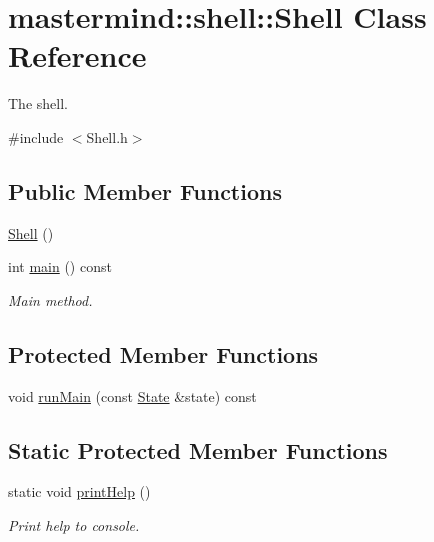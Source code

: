 \hypertarget{classmastermind_1_1shell_1_1_shell}{}\section{mastermind\+:\+:shell\+:\+:Shell Class Reference}
\label{classmastermind_1_1shell_1_1_shell}


The shell.  




{\ttfamily \#include $<$Shell.\+h$>$}

\subsection*{Public Member Functions}
\begin{DoxyCompactItemize}
\item 
\hyperlink{classmastermind_1_1shell_1_1_shell_accc6d14d851bf9adf00c93837c5f1526}{Shell} ()
\item 
int \hyperlink{classmastermind_1_1shell_1_1_shell_ae0b334aea0b022f03424f70593a40a9b}{main} () const
\begin{DoxyCompactList}\small\item\em Main method. \end{DoxyCompactList}\end{DoxyCompactItemize}
\subsection*{Protected Member Functions}
\begin{DoxyCompactItemize}
\item 
void \hyperlink{classmastermind_1_1shell_1_1_shell_ab74c8abb6d0caac122de8906bbcc6a3c}{run\+Main} (const \hyperlink{classmastermind_1_1shell_1_1_state}{State} \&state) const
\end{DoxyCompactItemize}
\subsection*{Static Protected Member Functions}
\begin{DoxyCompactItemize}
\item 
static void \hyperlink{classmastermind_1_1shell_1_1_shell_afa07030d8818db52935dcba29b25d708}{print\+Help} ()
\begin{DoxyCompactList}\small\item\em Print help to console. \end{DoxyCompactList}\end{DoxyCompactItemize}
